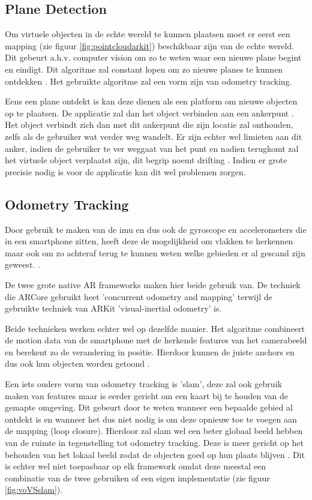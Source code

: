 \subsection{Plane Detection}
Om virtuele objecten in de echte wereld te kunnen plaatsen moet er eerst een mapping (zie figuur \ref{fig:pointcloudarkit}) beschikbaar zijn van de echte wereld. Dit gebeurt a.h.v. computer vision om zo te weten waar een nieuwe plane begint en eindigt. Dit algoritme zal constant lopen om zo nieuwe planes te kunnen ontdekken \autocite{Xu2018}. Het gebruikte algoritme zal een vorm zijn van odometry tracking.

Eens een plane ontdekt is kan deze dienen als een platform om nieuwe objecten op te plaatsen. De applicatie zal dan het object verbinden aan een ankerpunt \autocite{ARCoreAnchor}. Het object verbindt zich dan met dit ankerpunt die zijn locatie zal onthouden, zelfs als de gebruiker wat verder weg wandelt. Er zijn echter wel limieten aan dit anker, indien de gebruiker te ver weggaat van het punt en nadien terugkomt zal het virtuele object verplaatst zijn, dit begrip noemt drifting \autocite{You1999}. Indien er grote precisie nodig is voor de applicatie kan dit wel problemen zorgen.

\subsection{Odometry Tracking}

Door gebruik te maken van de \acrshort{imu} en dus ook de gyroscope en accelerometers die in een smartphone zitten, heeft deze de mogelijkheid om vlakken te herkennen maar ook om zo achteraf terug te kunnen weten welke gebieden er al gescand zijn geweest. \autocite{Leutenegger2015}.

De twee grote native AR frameworks maken hier beide gebruik van. De techniek die ARCore gebruikt heet 'concurrent odometry and mapping' \autocite{ARCoreConcepts} terwijl de gebruikte techniek van ARKit 'visual-inertial odometry' \autocite{ARKitWorldTracking} is. 

Beide technieken werken echter wel op dezelfde manier. Het algoritme combineert de motion data van de smartphone met de herkende features van het camerabeeld en berekent zo de verandering in positie. Hierdoor kunnen de juiste anchors en dus ook hun objecten worden getoond \autocite{ARCoreConcepts} \autocite{ARKitWorldTracking}.

Een iets oudere vorm van odometry tracking is '\acrfull{slam}', deze zal ook gebruik maken van features maar is eerder gericht om een kaart bij te houden van de gemapte omgeving. Dit gebeurt door te weten wanneer een bepaalde gebied al ontdekt is en wanneer het dus niet nodig is om deze opnieuw toe te voegen aan de mapping (loop closure). Hierdoor zal \acrshort{slam} wel een beter globaal beeld hebben van de ruimte in tegenstelling tot odometry tracking. Deze is meer gericht op het behouden van het lokaal beeld zodat de objecten goed op hun plaats blijven \autocite{Yousif2015}. Dit is echter wel niet toepasbaar op elk framework omdat deze meestal een combinatie van de twee gebruiken of een eigen implementatie (zie figuur \ref{fig:voVSslam}).

